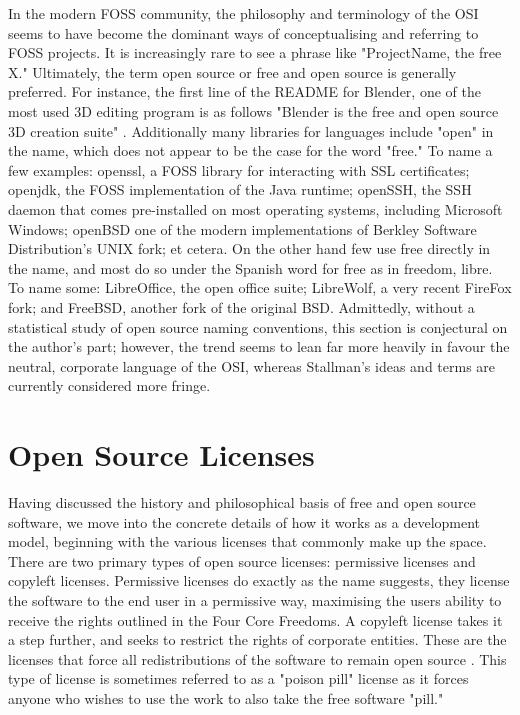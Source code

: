 \documentclass[manuscript,screen,nonacm,12pt]{acmart}
\begin{document}
In the modern FOSS community, the philosophy and terminology of the OSI seems to
have become the dominant ways of conceptualising and referring to FOSS projects.
It is increasingly rare to see a phrase like "ProjectName, the free X."
Ultimately, the term open source or free and open source is generally preferred.
For instance, the first line of the README for Blender, one of the most used 3D
editing program is as follows "Blender is the free and open source 3D creation
suite" \cite{blender2019}. Additionally many libraries for languages include
"open" in the name, which does not appear to be the case for the word "free." To
name a few examples: openssl, a FOSS library for interacting with SSL
certificates; openjdk, the FOSS implementation of the Java runtime; openSSH, the
SSH daemon that comes pre-installed on most operating systems, including
Microsoft Windows; openBSD one of the modern implementations of Berkley Software
Distribution's UNIX fork; et cetera. On the other hand few use free
directly in the name, and most do so under the Spanish word for free as in
freedom, libre. To name some: LibreOffice, the open office suite; LibreWolf, a
very recent FireFox fork; and FreeBSD, another fork of the original BSD.
Admittedly, without a statistical study of open source naming conventions, this
section is conjectural on the author's part; however, the trend seems to lean
far more heavily in favour the neutral, corporate language of the OSI, whereas
Stallman's ideas and terms are currently considered more fringe.

\section{Open Source Licenses}
Having discussed the history and philosophical basis of free and open source
software, we move into the concrete details of how it works as a development
model, beginning with the various licenses that commonly make up the space.
There are two primary types of open source licenses: permissive licenses and
copyleft licenses. Permissive licenses do exactly as the name suggests, they
license the software to the end user in a permissive way, maximising the users
ability to receive the rights outlined in the Four Core Freedoms. A copyleft
license takes it a step further, and seeks to restrict the rights of corporate
entities. These are the licenses that force all redistributions of the software
to remain open source \cite{morin2012}. This type of license is sometimes
referred to as a "poison pill" license as it forces anyone who wishes to use the
work to also take the free software "pill." 
\end{document}
